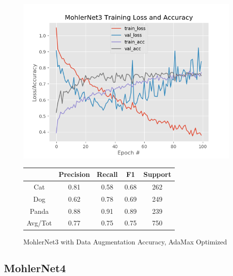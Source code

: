 \documentclass[12pt]{article}
\begin{document}
\begin{figure}[h]
	\centering %
	\captionsetup{justification=centering}
	\begin{minipage}{0.5\textwidth}
		\centering %
		\includegraphics[width=1\textwidth]{MohlerNet3_opt-AdamaxAugmented_KEEP.png}
		\caption{MohlerNet3 with Data Augmentation Accuracy, AdaMax Optimized} \label{MN3Aug}
	\end{minipage}\hfill
	\begin{minipage}{0.5\textwidth}
		\begin{center}
			\begin{tabular}[5pt]{| c| c| c| c|c|}
				\hline
				& Precision & Recall & F1 & Support \\[0.5ex] 
				\hline 	
				Cat   &    0.81&      0.58 &     0.68  &     262\\ \hline 
				Dog    &   0.62 &     0.78 &     0.69 &      249    \\ \hline 
				Panda   &   0.88&      0.91  &    0.89  &     239   \\ \hline 
				Avg/Tot  &    0.77 &     0.75   &   0.75   &    750\\ \hline 
				
			\end{tabular}
			\label{MN3RAug}
		\end{center}	
	\end{minipage}
\end{figure}

\subsection{MohlerNet4}
\end{document}
